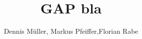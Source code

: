 \documentclass[orivec]{llncs}
\begin{document}


\title{GAP bla}
\author{Dennis Müller, Markus Pfeiffer,Florian Rabe}

\maketitle





\end{document}
